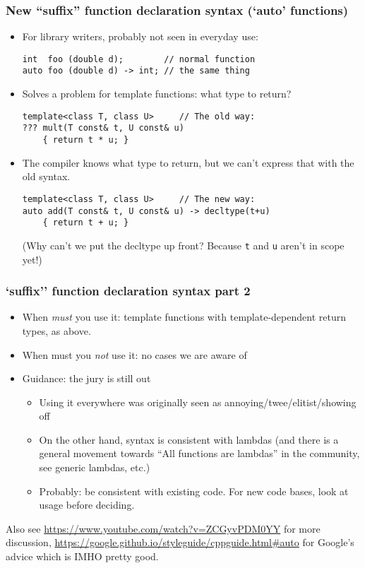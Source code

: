 
\begin{frame}[fragile]
\frametitle{New ``suffix'' function declaration syntax (`auto' functions)}
\begin{itemize}
\item For library writers, probably not seen in everyday use:
{\scriptsize
\begin{verbatim}
int  foo (double d);        // normal function
auto foo (double d) -> int; // the same thing
\end{verbatim}}
\vskip 6pt
\item Solves a problem for template functions: what type to return?
{\scriptsize
\begin{verbatim}
template<class T, class U>     // The old way:
??? mult(T const& t, U const& u)
    { return t * u; }
\end{verbatim}}
\vskip 6pt

\item The compiler knows what type to return, but we can't express
  that with the old syntax.
{\scriptsize
\begin{verbatim}
template<class T, class U>     // The new way:
auto add(T const& t, U const& u) -> decltype(t+u)
    { return t + u; }
\end{verbatim}}
\vskip 6pt
(Why can't we put the decltype up front?  Because \texttt{t} and
\texttt{u} aren't in scope yet!)
\end{itemize}
\end{frame}


\begin{frame}[fragile]
\frametitle{`suffix'' function declaration syntax part 2}
\begin{itemize}
\item When \emph{must} you use it: template functions with template-dependent return types, as above.
\item When must you \emph{not} use it: no cases we are aware of
\item Guidance: the jury is still out
  \begin{itemize}
  \item Using it everywhere was originally seen as annoying/twee/elitist/showing off
  \item On the other hand, syntax is consistent with lambdas (and there is a general movement
    towards ``All functions are lambdas'' in the community, see  generic lambdas, etc.)
  \item Probably: be consistent with existing code.  For new code bases, look at  usage before deciding.
\end{itemize}
\end{itemize}

Also see \url{https://www.youtube.com/watch?v=ZCGyvPDM0YY} for more discussion, \url{https://google.github.io/styleguide/cppguide.html#auto} for Google's advice which is IMHO pretty good.

\end{frame}
